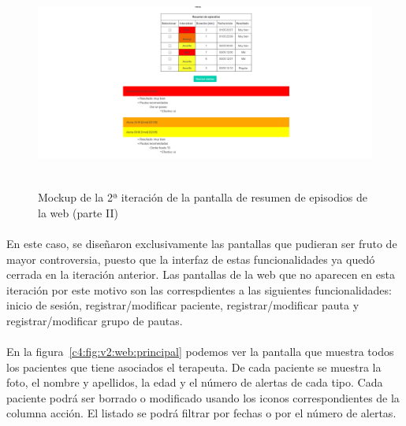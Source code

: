 \begin{figure}[H]
    \centering
    \includegraphics[width=0.8\linewidth, height=7cm]{Imagenes/04DescProblema/mockups/v2/web/03-resumenEpisodios-2.png}
    \caption[Mockup de la 2ª iteración de la pantalla de resumen de episodios de la web (parte II)]{Mockup de la 2ª iteración de la pantalla de resumen de episodios de la web (parte II)}
    \label{c4:fig:v2:web:episodios2}
\end{figure}

\paragraph{}
En este caso, se diseñaron exclusivamente las pantallas que pudieran ser fruto de mayor controversia, puesto que la interfaz de estas funcionalidades ya quedó cerrada en la iteración anterior. Las pantallas de la web que no aparecen en esta iteración por este motivo son las correspdientes a las siguientes funcionalidades: inicio de sesión, registrar/modificar paciente, registrar/modificar pauta y registrar/modificar grupo de pautas.

\paragraph{}
En la figura~\ref{c4:fig:v2:web:principal} podemos ver la pantalla que muestra todos los pacientes que tiene asociados el terapeuta. De cada paciente se muestra la foto, el nombre y apellidos, la edad y el número de alertas de cada tipo. Cada paciente podrá ser borrado o modificado usando los iconos correspondientes de la columna acción. El listado se podrá filtrar por fechas o por el número de alertas.

